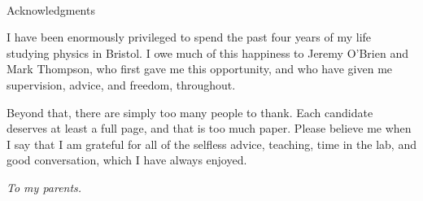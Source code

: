 \newpage
~\\
\vspace{50pt}
\begin{center}
{\Large \sc Acknowledgments \\ \rm}
\vspace{25pt}
\end{center}

I have been enormously privileged to spend the past four years of my life studying physics in Bristol. I owe much of this happiness to Jeremy O'Brien and Mark Thompson, who first gave me this opportunity, and who have given me supervision, advice, and freedom, throughout. 

Beyond that, there are simply too many people to thank. Each candidate deserves at least a full page, and that is too much paper. Please believe me when I say that I am grateful for all of the selfless advice, teaching, time in the lab, and good conversation, which I have always enjoyed.


















\vspace{30pt}
\begin{center}
\textit{To my parents.}
\end{center}



